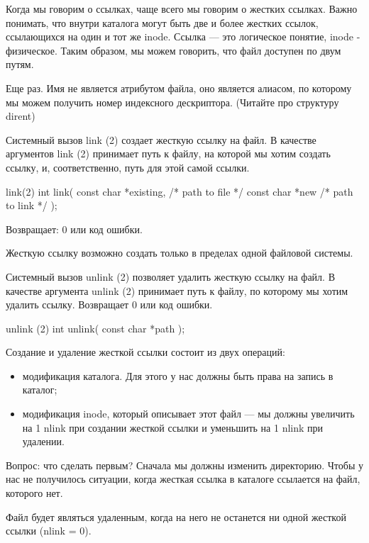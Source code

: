 Когда мы говорим о ссылках, чаще всего мы говорим о жестких ссылках. Важно понимать, что внутри каталога могут быть две и более жестких ссылок, ссылающихся на один и тот же inode. Ссылка --- это логическое понятие, inode - физическое. Таким образом, мы можем говорить, что файл доступен по двум путям.

Еще раз. Имя не является атрибутом файла, оно является алиасом, по которому мы можем получить номер индексного дескриптора. (Читайте про структуру dirent)

Системный вызов link (2) создает жесткую ссылку на файл. В качестве аргументов link (2) принимает путь к файлу, на которой мы хотим создать ссылку, и, соответственно, путь для этой самой ссылки.

\begin{CCode}{link(2)}
	int link( 
		const char *existing,	/* path to file */ 
		const char *new			/* path to link */ 
	); \end{CCode}
Возвращает: 0 или код ошибки.

\begin{important}
	Жесткую ссылку возможно создать только в пределах одной файловой системы.
\end{important}

Системный вызов unlink (2) позволяет удалить жесткую ссылку на файл. В качестве аргумента unlink (2) принимает путь к файлу, по которому мы хотим удалить ссылку. Возвращает 0 или код ошибки.

\begin{CCode}{unlink (2)}
	int unlink(
		const char *path
	);	\end{CCode}

Создание и удаление жесткой ссылки состоит из двух операций:

\begin{itemize}
	\item {модификация каталога. Для этого у нас должны быть права на запись в каталог;}
	
	\item {модификация inode, который описывает этот файл --- мы должны увеличить на 1 nlink при создании жесткой ссылки и уменьшить на 1 nlink при удалении.}
\end{itemize}

Вопрос: что сделать первым? Сначала мы должны изменить директорию. Чтобы у нас не получилось ситуации, когда жесткая ссылка в каталоге ссылается на файл, которого нет.

\begin{important}
	Файл будет являться удаленным, когда на него не останется ни одной жесткой ссылки (nlink = 0).
\end{important}